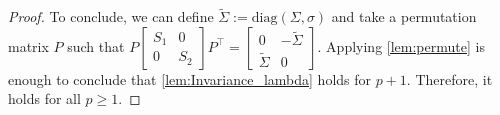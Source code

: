 \documentclass[10pt,twoside,dvipsnames]{siamart1116}
\numberwithin{algorithm}{section}
\numberwithin{equation}{section}
\newcommand{\simcom}{\textcolor{blue}{SM:} \textcolor{blue}}
\begin{document}
\begin{proof}
			To conclude, we can define $\widetilde{\Sigma}:=\mathrm{diag}(\Sigma,\sigma)$ and take a permutation matrix $P$ such that $P\left[\begin{smallmatrix}
			S_1&0\\
			0&S_2
			\end{smallmatrix}\right]P^\top =\left[\begin{smallmatrix}
			0&-\widetilde{\Sigma}\\
			\widetilde{\Sigma}&0
			\end{smallmatrix}\right]$. Applying \cref{lem:permute} is enough to conclude that \cref{lem:Invariance_lambda} holds for $p+1$. Therefore, it holds for all $p\geq 1$.
	\end{proof}

\end{document}
